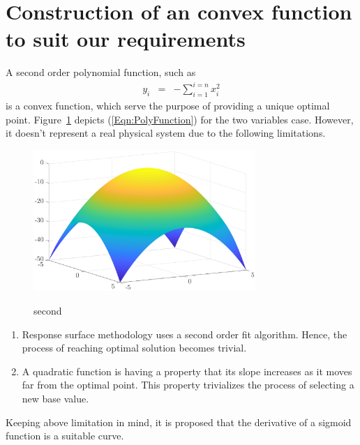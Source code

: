 \documentclass[letterpaper, 12pt]{article}
\begin{document}
\section{Construction of an convex function to suit our requirements}
A second order polynomial function, such as
\begin{eqnarray}
y_i &=& -\sum_{i=1}^{i=n}{x_i^2} \label{Eqn:PolyFunction}
\end{eqnarray}
is a convex function, which serve the purpose of providing a unique optimal point. Figure~\ref{Fig:TwoVariablePolynomial} depicts (\ref{Eqn:PolyFunction}) for the two variables case. However, it doesn't represent a real physical system due to the following limitations.
\begin{figure}
	\centering
	\includegraphics[width=0.75\textwidth]{MATLAB/poly-2-var}
	\label{Fig:TwoVariablePolynomial}
	\caption{second}
\end{figure}
\begin{enumerate}
	\item Response surface methodology uses a second order fit algorithm. Hence, the process of reaching optimal solution becomes trivial.
	\item A quadratic function is having a property that its slope increases as it moves far from the optimal point. This property trivializes the process of selecting a new base value.
\end{enumerate}
\par
Keeping above limitation in mind, it is proposed that the derivative of a sigmoid function is a suitable curve. 


\end{document}
